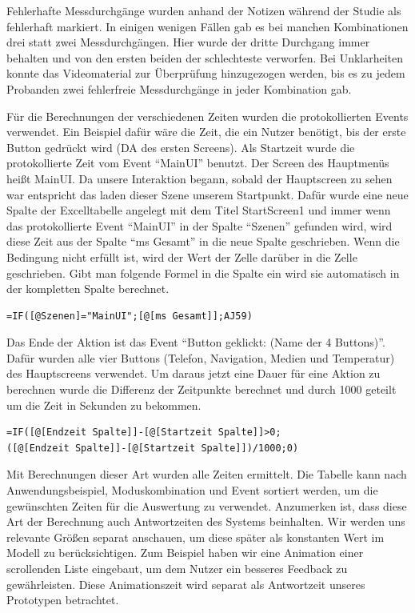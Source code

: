 Fehlerhafte Messdurchgänge wurden anhand der Notizen während der Studie als fehlerhaft markiert. In einigen wenigen Fällen gab es bei manchen Kombinationen drei statt zwei Messdurchgängen. Hier wurde der dritte Durchgang immer behalten und von den ersten beiden der schlechteste verworfen. Bei Unklarheiten konnte das Videomaterial zur Überprüfung hinzugezogen werden, bis es zu jedem Probanden zwei fehlerfreie Messdurchgänge in jeder Kombination gab. 

Für die Berechnungen der verschiedenen Zeiten wurden die protokollierten Events verwendet. Ein Beispiel dafür wäre die Zeit, die ein Nutzer benötigt, bis der erste Button gedrückt wird (DA des ersten Screens). Als Startzeit wurde die protokollierte Zeit vom Event "`MainUI"' benutzt. Der Screen des Hauptmenüs heißt MainUI. Da unsere Interaktion begann, sobald der Hauptscreen zu sehen war entspricht das laden dieser Szene unserem Startpunkt. Dafür wurde eine neue Spalte der Excelltabelle angelegt mit dem Titel StartScreen1 und immer wenn das protokollierte Event "`MainUI"' in der Spalte "`Szenen"' gefunden wird, wird diese Zeit aus der Spalte "`ms Gesamt"' in die neue Spalte geschrieben. Wenn die Bedingung nicht erfüllt ist, wird der Wert der Zelle darüber in die Zelle geschrieben. Gibt man folgende Formel in die Spalte ein wird sie automatisch in der kompletten Spalte berechnet.  
\begin{lstlisting}
=IF([@Szenen]="MainUI";[@[ms Gesamt]];AJ59)
\end{lstlisting}
Das Ende der Aktion ist das Event "`Button geklickt: (Name der 4 Buttons)"'. Dafür wurden alle vier Buttons (Telefon, Navigation, Medien und Temperatur) des Hauptscreens verwendet. 
Um daraus jetzt eine Dauer für eine Aktion zu berechnen wurde die Differenz der Zeitpunkte berechnet und durch 1000 geteilt um die Zeit in Sekunden zu bekommen.
\begin{lstlisting}
=IF([@[Endzeit Spalte]]-[@[Startzeit Spalte]]>0;
([@[Endzeit Spalte]]-[@[Startzeit Spalte]])/1000;0)
\end{lstlisting}

Mit Berechnungen dieser Art wurden alle Zeiten ermittelt. Die Tabelle kann nach Anwendungsbeispiel, Moduskombination und Event sortiert werden, um die gewünschten Zeiten für die Auswertung zu verwendet. Anzumerken ist, dass diese Art der Berechnung auch Antwortzeiten des Systems beinhalten. Wir werden uns relevante Größen separat anschauen, um diese später als konstanten Wert im Modell zu berücksichtigen. Zum Beispiel haben wir eine Animation einer scrollenden Liste eingebaut, um dem Nutzer ein besseres Feedback zu gewährleisten. Diese Animationszeit wird separat als Antwortzeit unseres Prototypen betrachtet. 

